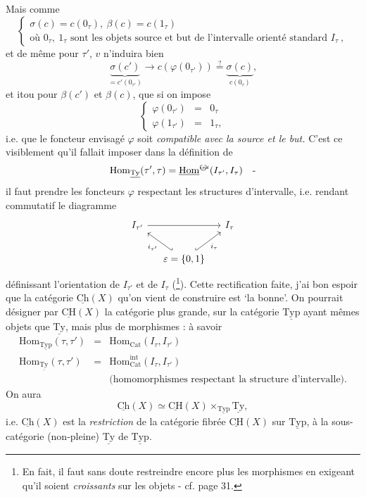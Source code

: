 \documentclass[11pt]{article}
\newcommand{\printedpage}[1]{\marginpar{\footnotesize p.~#1}}
\newcommand{\msp}[1]{\marginpar{\footnotesize [#1]}}
\newcommand{\circled}[1]{\text{\textcircled{$\scriptstyle #1$}}}
\newcommand{\ul}[1]{\underline{\mathrm{#1}}}
\begin{document}
\msp{page 29}
Mais comme
\[
\left\{
\begin{array}{l}
\sigma(c)=c(0_\tau),\ \beta(c)=c(1_\tau)\\[1ex]
\text{où } 0_\tau,\ 1_\tau \text{ sont les objets source et but de l'intervalle orienté standard } I_\tau\ ,
\end{array}
\right.
\]
et de même pour $\tau'$, $v$ n'induira bien
\[
\underbrace{\sigma(c')}_{=c'(0_{\tau'})} \longrightarrow c(\varphi(0_{\tau'})) \overset{?}{=} \underbrace{\sigma(c)}_{c(0_\tau)},
\]
et itou pour $\beta(c')$ et $\beta(c)$, que si on impose
\[
\boxed{
\left\{
\begin{array}{lcl}
\varphi(0_{\tau'}) & = & 0_\tau\\
\varphi(1_{\tau'}) & = & 1_\tau,
\end{array}
\right.
}
\]
i.e. que le foncteur envisagé $\varphi$ soit \textit{compatible avec la source et le but.} C'est ce visiblement qu'il fallait imposer dans la définition de %
\[
\mathrm{Hom}_{\ul{Ty}}(\tau',\tau)=\underline{\mathrm{Hom}}^{\circled{int}}(I_{\tau'},I_\tau)\quad\text{-}
\]
il faut prendre les foncteurs $\varphi$ respectant les structures d'intervalle, i.e. rendant commutatif le diagramme
\[
\begin{tikzcd}[column sep=small]
I_{\tau'} \arrow[rr] & & I_\tau \\
& \varepsilon=\{0,1\} \arrow[ul, hook', "i_{\tau'}"] \arrow[ur, hook, "i_\tau"'] &
\end{tikzcd}
\]
définissant l'orientation de $I_{\tau'}$ et de $I_\tau$ (\footnote[10]{En fait, il faut sans doute restreindre encore plus les morphismes en exigeant qu'il soient \textit{croissants} sur les objets - cf. page 31.}). Cette rectification faite, j'ai bon espoir que la catégorie $\ul{Ch}(X)$ qu'on vient de construire est `la bonne'. On pourrait désigner par $\ul{CH}(X)$ la catégorie plus grande, sur la catégorie $\ul{Typ}$ ayant mêmes objets que $\ul{Ty}$, mais plus de morphismes : à savoir %
\msp{page 30}
\[
\begin{array}{lcl}
\mathrm{Hom}_{\ul{Typ}}(\tau,\tau') & = & \mathrm{Hom}_{\mathrm{Cat}}(I_\tau,I_{\tau'})\\[0.5ex]
\mathrm{Hom}_{\ul{Ty}}(\tau,\tau') & = & \mathrm{Hom}^{\mathrm{int}}_{\mathrm{Cat}}(I_\tau,I_{\tau'})\\[0.5ex]
 & & \text{(homomorphismes respectant la structure d'intervalle).}
\end{array}
\]
On aura
\[
\ul{Ch}(X)\simeq\ul{CH}(X)\times_{\ul{Typ}}\ul{Ty},
\]
\printedpage{20}
i.e. $\ul{Ch}(X)$ est la \textit{restriction} de la catégorie fibrée $\ul{CH}(X)$ sur $\ul{Typ}$, à la sous-catégorie (non-pleine) $\ul{Ty}$ de $\ul{Typ}$.
\end{document}
